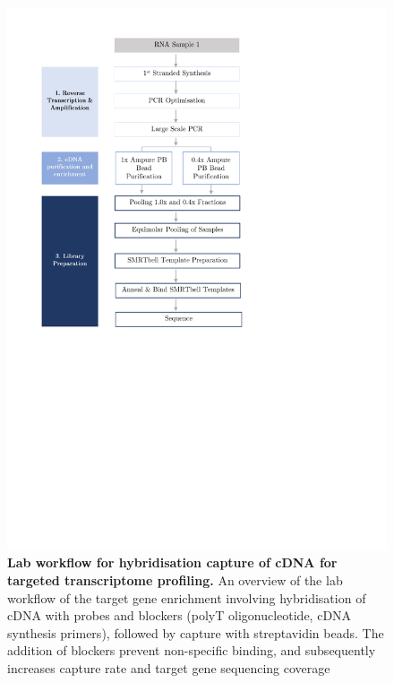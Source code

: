 \begin{figure}[!h]
	\begin{center}
		\includegraphics[page=12,trim={0cm 6cm 0cm 1cm},clip,scale = 0.70]{Figures/ProjectDevelopment_Figures.pdf}
	\end{center}
	\captionsetup{width=0.95\textwidth}
	\caption[Lab workflow for hybridisation capture of cDNA for targeted transcriptome profiling]%
	{\textbf{Lab workflow for hybridisation capture of cDNA for targeted transcriptome profiling.} An overview of the lab workflow of the target gene enrichment involving hybridisation of cDNA with probes and blockers (polyT oligonucleotide, cDNA synthesis primers), followed by capture with streptavidin beads. The addition of blockers prevent non-specific binding, and subsequently increases capture rate and target gene sequencing coverage}
	\label{fig:isoseq_targetcapture}
\end{figure}

